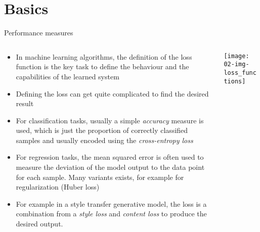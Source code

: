   \section{Basics}

    \begin{frame}{Performance measures}
      \begin{columns}
        \begin{column}{0.65\textwidth}
          \begin{itemize}
            \item In machine learning algorithms, the definition of the loss function is the key task to define the behaviour and the capabilities of the learned system
            \item Defining the loss can get quite complicated to find the desired result
            \item For classification tasks, usually a simple \emph{accuracy} measure is used, which is just the proportion of correctly classified samples and usually encoded using the \emph{cross-entropy loss}
            \item For regression tasks, the mean squared error is often used to measure the deviation of the model output to the data point for each sample.
              Many variants exists, for example for regularization (Huber loss)
            \item For example in a style transfer generative model, the loss is a combination from a \emph{style loss} and \emph{content loss} to produce the desired output.
          \end{itemize}
        \end{column}
        \begin{column}{0.35\textwidth}
          \vspace*{1em}
          \texttt{[image: 02-img-loss\_functions]}
        \end{column}
      \end{columns}
    \end{frame}

